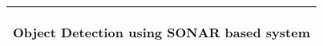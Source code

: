 %
%
%
%
%
\begin{titlepage}
  \addtolength{\hoffset}{0.5\evensidemargin-0.5\oddsidemargin} %
  \noindent%
  \begin{tabular}{@{}p{\textwidth}@{}}
    \toprule[2pt]
    \midrule
    \vspace{0.2cm}
    \begin{center}
    \Huge{\textbf{
      Object Detection using SONAR based system%
    }}
    \end{center}

    \vspace{0.2cm}\\
    \midrule
    \toprule[2pt]


\end{tabular}
\end{titlepage}

